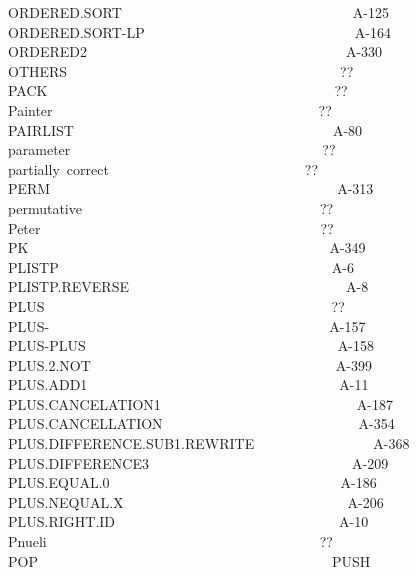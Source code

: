 \documentclass[11pt]{book}
\newenvironment{pubasis}{\begin{flushleft}\ttfamily\small}{\normalsize\rmfamily\end{flushleft}}
\begin{document}
\begin{pubasis}
ORDERED.SORT~~~~~~~~~~~~~~~~~~~~~~~~~~~~~~~~~A-125\\
ORDERED.SORT-LP~~~~~~~~~~~~~~~~~~~~~~~~~~~~~~A-164\\
ORDERED2~~~~~~~~~~~~~~~~~~~~~~~~~~~~~~~~~~~~~A-330\\
OTHERS~~~~~~~~~~~~~~~~~~~~~~~~~~~~~~~~~~~~~~~??\\
PACK~~~~~~~~~~~~~~~~~~~~~~~~~~~~~~~~~~~~~~~~~??\\
Painter~~~~~~~~~~~~~~~~~~~~~~~~~~~~~~~~~~~~~~??\\
PAIRLIST~~~~~~~~~~~~~~~~~~~~~~~~~~~~~~~~~~~~~A-80\\
parameter~~~~~~~~~~~~~~~~~~~~~~~~~~~~~~~~~~~~??\\
partially~correct~~~~~~~~~~~~~~~~~~~~~~~~~~~~??\\
PERM~~~~~~~~~~~~~~~~~~~~~~~~~~~~~~~~~~~~~~~~~A-313\\
permutative~~~~~~~~~~~~~~~~~~~~~~~~~~~~~~~~~~??\\
Peter~~~~~~~~~~~~~~~~~~~~~~~~~~~~~~~~~~~~~~~~??\\
PK~~~~~~~~~~~~~~~~~~~~~~~~~~~~~~~~~~~~~~~~~~~A-349\\
PLISTP~~~~~~~~~~~~~~~~~~~~~~~~~~~~~~~~~~~~~~~A-6\\
PLISTP.REVERSE~~~~~~~~~~~~~~~~~~~~~~~~~~~~~~~A-8\\
PLUS~~~~~~~~~~~~~~~~~~~~~~~~~~~~~~~~~~~~~~~~~??\\
PLUS-~~~~~~~~~~~~~~~~~~~~~~~~~~~~~~~~~~~~~~~~A-157\\
PLUS-PLUS~~~~~~~~~~~~~~~~~~~~~~~~~~~~~~~~~~~~A-158\\
PLUS.2.NOT~~~~~~~~~~~~~~~~~~~~~~~~~~~~~~~~~~~A-399\\
PLUS.ADD1~~~~~~~~~~~~~~~~~~~~~~~~~~~~~~~~~~~~A-11\\
PLUS.CANCELATION1~~~~~~~~~~~~~~~~~~~~~~~~~~~~A-187\\
PLUS.CAN\-CELLATION~~~~~~~~~~~~~~~~~~~~~~~~~~~~A-354\\
PLUS.DIF\-FER\-ENCE.SUB1.REWRITE~~~~~~~~~~~~~~~~~A-368\\
PLUS.DIF\-FER\-ENCE3~~~~~~~~~~~~~~~~~~~~~~~~~~~~~A-209\\
PLUS.EQUAL.0~~~~~~~~~~~~~~~~~~~~~~~~~~~~~~~~~A-186\\
PLUS.NEQUAL.X~~~~~~~~~~~~~~~~~~~~~~~~~~~~~~~~A-206\\
PLUS.RIGHT.ID~~~~~~~~~~~~~~~~~~~~~~~~~~~~~~~~A-10\\
Pnueli~~~~~~~~~~~~~~~~~~~~~~~~~~~~~~~~~~~~~~~??\\
POP~~~~~~~~~~~~~~~~~~~~~~~~~~~~~~~~~~~~~~~~~~PUSH\\

\end{pubasis}
\end{document}
